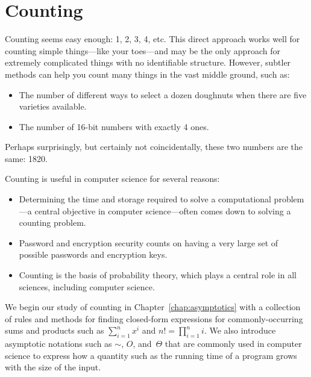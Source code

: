 \part{Counting}
\label{part:counting}

\partintro
{}

Counting seems easy enough: 1, 2, 3, 4, etc.  This direct approach
works well for counting simple things---like your toes---and may be
the only approach for extremely complicated things with no
identifiable structure.  However, subtler methods can help you count
many things in the vast middle ground, such as:
\begin{itemize}

\item The number of different ways to select a dozen doughnuts when
there are five varieties available.

\item The number of 16-bit numbers with exactly 4 ones.

\end{itemize}
Perhaps surprisingly, but certainly not coincidentally, these two
numbers are the same: 1820.

Counting is useful in computer science for several reasons:
\begin{itemize}

\item
Determining the time and storage required to solve a computational
problem---a central objective in computer science---often comes down
to solving a counting problem.

\item Password and encryption security counts on having a very large
  set of possible passwords and encryption keys.

\item
Counting is the basis of probability theory, which plays a central
role in all sciences, including computer science.

\iffalse

\item
Two remarkable proof techniques, the ``\idx{pigeonhole principle}''
and ``\idx{combinatorial proof},'' rely on counting.
These lead to a variety of interesting and useful insights.
\fi

\end{itemize}


We begin our study of counting in Chapter~\ref{chap:asymptotics} with
a collection of rules and methods for finding closed-form expressions
for commonly-occurring sums and products such as $\sum_{i = 1}^n x^i$
and $n! = \prod_{i=1}^n i$.  We also introduce asymptotic notations
such as $\sim$, $O$, and~$\Theta$ that are commonly used in computer
science to express how a quantity such as the running time of a
program grows with the size of the input.

